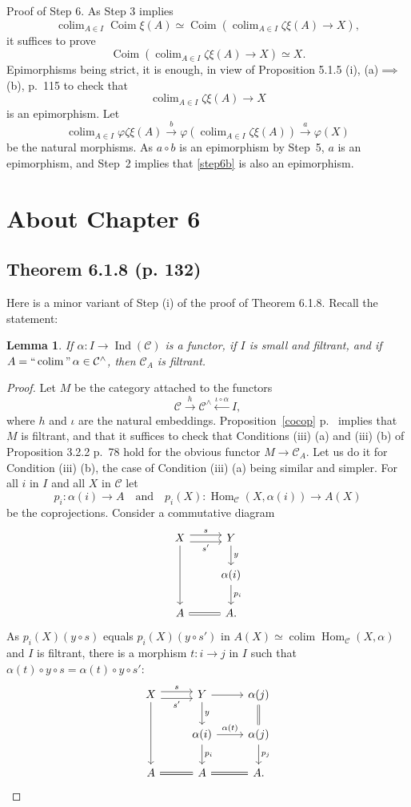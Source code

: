\documentclass[12pt]{article}
\newtheorem{lem}[thm]{Lemma}
\theoremstyle{remark}
\theoremstyle{definition}
\newcommand{\C}{\mathcal C}
\DeclareMathOperator*{\coli}{colim}
\DeclareMathOperator*{\co}{colim}
\DeclareMathOperator*{\ic}{``\coli"}
\DeclareMathOperator{\Coim}{Coim}
\DeclareMathOperator{\Hom}{Hom}%
\DeclareMathOperator{\Ind}{Ind}
\begin{document}
\noindent Proof of Step 6. As Step 3 implies 
$$
\coli_{A\in I}\Coim\xi(A)\simeq\Coim\left(\coli_{A\in I}\zeta\xi(A)\to X\right),
$$ 
it suffices to prove 
%
\begin{equation}\label{step6a}
\Coim\left(\coli_{A\in I}\zeta\xi(A)\to X\right)\simeq X.
\end{equation}
% 
Epimorphisms being strict, it is enough, in view of Proposition 5.1.5 (i), (a)$\implies$(b), p.~115 to check that 
%
\begin{equation}\label{step6b}
\coli_{A\in I}\zeta\xi(A)\to X
\end{equation}
% 
is an epimorphism. Let 
$$
\coli_{A\in I}\varphi\zeta\xi(A)\xrightarrow{b}\varphi\left(\coli_{A\in I}\zeta\xi(A)\right)\xrightarrow{a}\varphi(X)
$$
be the natural morphisms. As $a\circ b$ is an epimorphism by Step~5, $a$ is an epimorphism, and Step~2 implies that \eqref{step6b} is also an epimorphism.
%
%
\section{About Chapter 6}
%
\subsection{Theorem 6.1.8 (p. 132)}
%
Here is a minor variant of Step (i) of the proof of Theorem 6.1.8. Recall the statement: 
%
\begin{lem} 
If $\alpha:I\to\Ind(\C)$ is a functor, if $I$ is small and filtrant, and if $A=\ic\alpha\in\C^\wedge$, then $\C_A$ is filtrant. 
\end{lem} 
%
\begin{proof}
Let $M$ be the category attached to the functors 
$$
\C\xrightarrow h\C^\wedge\xleftarrow{\iota\circ\alpha}I,
$$ 
where $h$ and $\iota$ are the natural embeddings. Proposition~\ref{cocop} p.~\pageref{cocop} implies that $M$ is filtrant, and that it suffices to check that Conditions (iii) (a) and (iii) (b) of Proposition 3.2.2 p.~78 hold for the obvious functor $M\to\C_A$. Let us do it for Condition (iii) (b), the case of Condition (iii) (a) being similar and simpler. For all $i$ in $I$ and all $X$ in $\C$ let 
$$
p_i:\alpha(i)\to A\quad\text{and}\quad p_i(X):\Hom_\C(X,\alpha(i))\to A(X)
$$
be the coprojections. Consider a commutative diagram 
$$
\begin{tikzcd}
X\ar{dd}\ar[yshift=0.7ex]{r}{s}\ar[yshift=-0.7ex]{r}[swap]{s'}&Y\ar{d}{y}\\ 
{}&\alpha(i)\ar{d}{p_i}\\ 
A\ar[equal]{r}&A.
\end{tikzcd}
$$ 
As $p_i(X)(y\circ s)$ equals $p_i(X)(y\circ s')$ in $A(X)\simeq\co\Hom_\C(X,\alpha)$ and $I$ is filtrant, there is a morphism $t:i\to j$ in $I$ such that $\alpha(t)\circ y\circ s=\alpha(t)\circ y\circ s'$:
$$
\begin{tikzcd}
X\ar{dd}\ar[yshift=0.7ex]{r}{s}\ar[yshift=-0.7ex]{r}[swap]{s'}&Y\ar{d}{y}\ar{r}&\alpha(j)\ar[equal]{d}\\ 
{}&\alpha(i)\ar{d}{p_i}\ar{r}{\alpha(t)}&\alpha(j)\ar{d}{p_j}\\ 
A\ar[equal]{r}&A\ar[equal]{r}&A.
\end{tikzcd}
$$
\end{proof}
%
%
\end{document}
